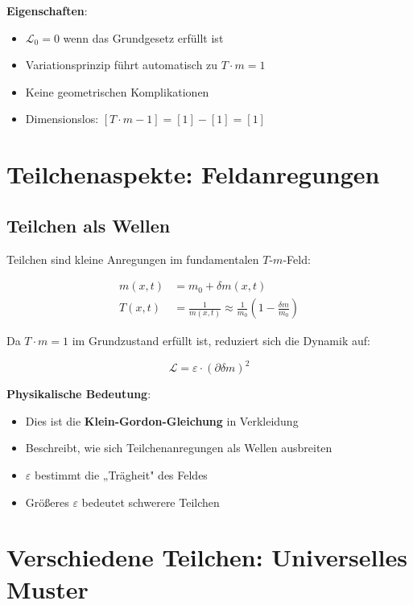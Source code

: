 \documentclass[12pt,a4paper]{article}
\newcommand{\Tfield}{T(x,t)}
\newcommand{\mfield}{m(x,t)}
\newcommand{\deltam}{\delta m}
\newcommand{\Lag}{\mathcal{L}}
\theoremstyle{definition}
\theoremstyle{remark}
\begin{document}
	\textbf{Eigenschaften}:
	\begin{itemize}
		\item $\Lag_0 = 0$ wenn das Grundgesetz erfüllt ist
		\item Variationsprinzip führt automatisch zu $T \cdot m = 1$
		\item Keine geometrischen Komplikationen
		\item Dimensionslos: $[T \cdot m - 1] = [1] - [1] = [1]$
	\end{itemize}
	
	\section{Teilchenaspekte: Feldanregungen}
	
	\subsection{Teilchen als Wellen}
	
	Teilchen sind kleine Anregungen im fundamentalen $T$-$m$-Feld:
	
	\begin{align}
		\mfield &= m_0 + \deltam(x,t) \\
		\Tfield &= \frac{1}{\mfield} \approx \frac{1}{m_0}\left(1 - \frac{\deltam}{m_0}\right)
	\end{align}
	
	Da $T \cdot m = 1$ im Grundzustand erfüllt ist, reduziert sich die Dynamik auf:
	
	\begin{equation}
		\boxed{\Lag = \varepsilon \cdot (\partial \deltam)^2}
		\label{eq:particle_lagrangian}
	\end{equation}
	
	\textbf{Physikalische Bedeutung}:
	\begin{itemize}
		\item Dies ist die \textbf{Klein-Gordon-Gleichung} in Verkleidung
		\item Beschreibt, wie sich Teilchenanregungen als Wellen ausbreiten
		\item $\varepsilon$ bestimmt die „Trägheit" des Feldes
		\item Größeres $\varepsilon$ bedeutet schwerere Teilchen
	\end{itemize}
	
	\section{Verschiedene Teilchen: Universelles Muster}
	
\end{document}
